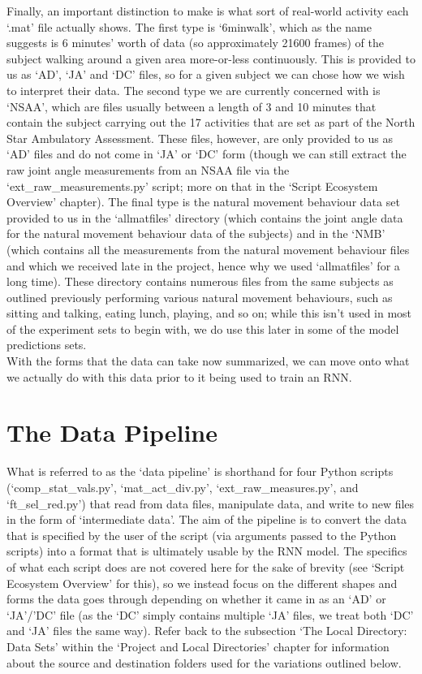 \documentclass[12pt,twoside]{report}
\begin{document}
\quad Finally, an important distinction to make is what sort of real-world activity each ‘.mat’ file actually shows. The first type is ‘6minwalk’, which as the name suggests is 6 minutes’ worth of data (so approximately 21600 frames) of the subject walking around a given area more-or-less continuously. This is provided to us as ‘AD’, ‘JA’ and ‘DC’ files, so for a given subject we can chose how we wish to interpret their data. The second type we are currently concerned with is ‘NSAA’, which are files usually between a length of 3 and 10 minutes that contain the subject carrying out the 17 activities that are set as part of the North Star Ambulatory Assessment. These files, however, are only provided to us as ‘AD’ files and do not come in ‘JA’ or ‘DC’ form (though we can still extract the raw joint angle measurements from an NSAA file via the ‘ext\_raw\_measurements.py’ script; more on that in the ‘Script Ecosystem Overview’ chapter). The final type is the natural movement behaviour data set provided to us in the ‘allmatfiles’ directory (which contains the joint angle data for the natural movement behaviour data of the subjects) and in the ‘NMB’ (which contains all the measurements from the natural movement behaviour files and which we received late in the project, hence why we used ‘allmatfiles’ for a long time). These directory contains numerous files from the same subjects as outlined previously performing various natural movement behaviours, such as sitting and talking, eating lunch, playing, and so on; while this isn’t used in most of the experiment sets to begin with, we do use this later in some of the model predictions sets.\\

\quad With the forms that the data can take now summarized, we can move onto what we actually do with this data prior to it being used to train an RNN.


\section{The Data Pipeline}

\quad What is referred to as the ‘data pipeline’ is shorthand for four Python scripts (‘comp\_stat\_vals.py’, ‘mat\_act\_div.py’, ‘ext\_raw\_measures.py’, and ‘ft\_sel\_red.py’) that read from data files, manipulate data, and write to new files in the form of ‘intermediate data’. The aim of the pipeline is to convert the data that is specified by the user of the script (via arguments passed to the Python scripts) into a format that is ultimately usable by the RNN model. The specifics of what each script does are not covered here for the sake of brevity (see ‘Script Ecosystem Overview’ for this), so we instead focus on the different shapes and forms the data goes through depending on whether it came in as an ‘AD’ or ‘JA’/’DC’ file (as the ‘DC’ simply contains multiple ‘JA’ files, we treat both ‘DC’ and ‘JA’ files the same way). Refer back to the subsection ‘The Local Directory: Data Sets’ within the ‘Project and Local Directories’ chapter for information about the source and destination folders used for the variations outlined below.
\end{document}

